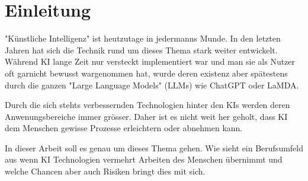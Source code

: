 \chapter{Einleitung}
\label{chap:introduction}

"Künstliche Intelligenz" ist heutzutage in jedermanns Munde. 
In den letzten Jahren hat sich die Technik rund um dieses Thema stark weiter entwickelt.
Während KI lange Zeit nur versteckt implementiert war und man sie als Nutzer oft garnicht bewusst wargenommen hat, wurde deren existenz aber spätestens durch die ganzen "Large Language Models" (LLMs) wie ChatGPT oder LaMDA.

Durch die sich stehts verbessernden Technologien hinter den KIs werden deren Anwenungsbereiche immer grösser.
Daher ist es nicht weit her geholt, dass KI dem Menschen gewisse Prozesse erleichtern oder abnehmen kann. 

In dieser Arbeit soll es genau um dieses Thema gehen. Wie sieht ein Berufsumfeld aus wenn KI Technologien vermehrt Arbeiten des Menschen übernimmt und welche Chancen aber auch Risiken bringt dies mit sich.